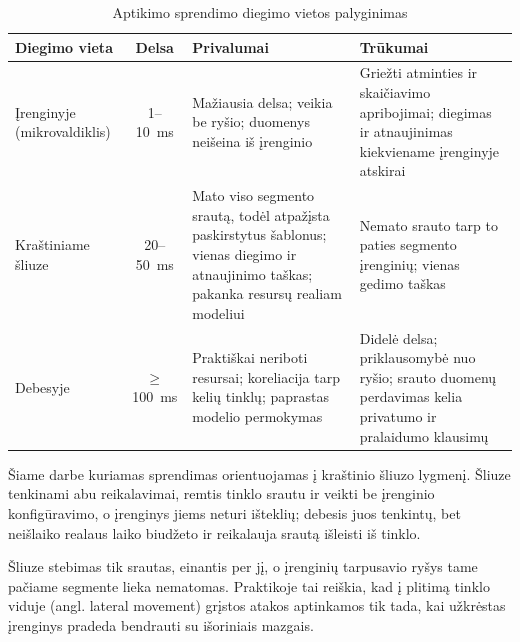 \begin{table}[htbp]
\centering
\caption{Aptikimo sprendimo diegimo vietos palyginimas}
\label{tab:diegimas}
\footnotesize
\setlength{\tabcolsep}{4pt}
\begin{tabularx}{\textwidth}{@{}
  >{\raggedright\arraybackslash}p{2.4cm}
  c
  >{\raggedright\arraybackslash}X
  >{\raggedright\arraybackslash}X@{}}
\toprule
\textbf{Diegimo vieta} & \textbf{Delsa} & \textbf{Privalumai}
  & \textbf{Trūkumai} \\
\midrule

Įrenginyje (mikro\-valdiklis)
  & 1--10~ms
  & Mažiausia delsa; veikia be ryšio; duomenys neišeina iš įrenginio
  & Griežti atminties ir skaičiavimo apribojimai; diegimas ir
    atnaujinimas kiekviename įrenginyje atskirai \\
\addlinespace

Kraštiniame šliuze
  & 20--50~ms
  & Mato viso segmento srautą, todėl atpažįsta paskirstytus šablonus;
    vienas diegimo ir atnaujinimo taškas; pakanka resursų realiam
    modeliui
  & Nemato srauto tarp to paties segmento įrenginių; vienas gedimo
    taškas \\
\addlinespace

Debesyje
  & $\geq$100~ms
  & Praktiškai neriboti resursai; koreliacija tarp kelių tinklų;
    paprastas modelio permokymas
  & Didelė delsa; priklausomybė nuo ryšio; srauto duomenų perdavimas
    kelia privatumo ir pralaidumo klausimų \\
\bottomrule
\end{tabularx}
\end{table}

Šiame darbe kuriamas sprendimas orientuojamas į kraštinio
šliuzo lygmenį. Šliuze tenkinami abu reikalavimai, remtis tinklo srautu
ir veikti be įrenginio konfigūravimo, o įrenginys jiems neturi išteklių;
debesis juos tenkintų, bet neišlaiko realaus laiko biudžeto ir reikalauja
srautą išleisti iš tinklo.

Šliuze stebimas tik srautas, einantis per jį, o įrenginių tarpusavio ryšys tame pačiame
segmente lieka nematomas. Praktikoje tai reiškia, kad į plitimą tinklo
viduje (angl. lateral movement) grįstos atakos aptinkamos tik
tada, kai užkrėstas įrenginys pradeda bendrauti su išoriniais mazgais.

